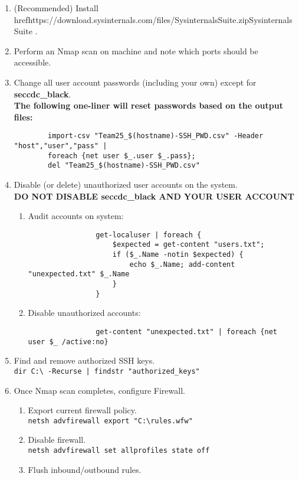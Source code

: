 \documentclass[12pt,letterpaper]{article}
\def\code#1{\textcolor{c2}{\texttt{#1}}}
\def\bf#1{\textbf{#1}}
\begin{document}
\begin{enumerate}
	\item (Recommended) Install href{https://download.sysinternals.com/files/SysinternalsSuite.zip}{Sysinternals Suite} .
	\item Perform an Nmap scan on machine and note which ports should be accessible.
	\item Change all user account passwords (including your own) except for \bf{seccdc\_black}. \\
		\bf{The following one-liner will reset passwords based on the output files:}
		\begin{verbatim}
		import-csv "Team25_$(hostname)-SSH_PWD.csv" -Header "host","user","pass" |
		foreach {net user $_.user $_.pass};
		del "Team25_$(hostname)-SSH_PWD.csv"
		\end{verbatim}
	\item Disable (or delete) unauthorized user accounts on the system. \\
	\bf{DO NOT DISABLE seccdc\_black AND YOUR USER ACCOUNT}
		\begin{enumerate}
			\item Audit accounts on system: 
				\begin{verbatim}
				get-localuser | foreach {
					$expected = get-content "users.txt";
					if ($_.Name -notin $expected) {
						echo $_.Name; add-content "unexpected.txt" $_.Name
					}
				}
				\end{verbatim}
			\item Disable unauthorized accounts:
				\begin{verbatim}
				get-content "unexpected.txt" | foreach {net user $_ /active:no}
				\end{verbatim}
		\end{enumerate}
	\item Find and remove authorized SSH keys. \\
		\code{dir C:\textbackslash{} -Recurse | findstr "authorized\_keys"}
	\item Once Nmap scan completes, configure Firewall.
		\begin{enumerate}
			\item Export current firewall policy. \\
				\code{netsh advfirewall export "C:\textbackslash{}rules.wfw"}
			\item Disable firewall. \\
				\code{netsh advfirewall set allprofiles state off}
			\item Flush inbound/outbound rules. \\

\end{enumerate}
\end{enumerate}
\end{document}
